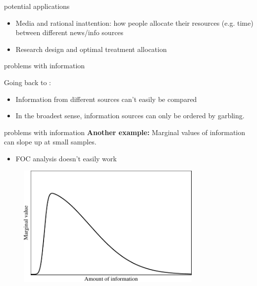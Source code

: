 \documentclass[square,]{gBakerBeamer}
\renewcommand{\|}{\,|\,}
\begin{document}
\begin{frame}{potential applications}

  \begin{itemize}
    \item Media and rational inattention: how people allocate their resources (e.g. time) between different news/info sources\bigskip

    \item Research design and optimal treatment allocation
  \end{itemize}

\end{frame}


\begin{frame}{problems with information}

  Going back to \cite{Blackwell1951}:\bigskip

  \begin{itemize}
    \item<1-> Information from different sources can't easily be compared\bigskip
    \item<2-> In the broadest sense, information sources can only be ordered by
          garbling.
  \end{itemize}
\end{frame}


\begin{frame}{problems with information}
  \textbf{Another example:}  Marginal values of
  information can slope up at small samples.

  \begin{itemize}
    \item FOC analysis doesn't easily work
  \end{itemize}

  \begin{figure}[h]
    \centering
    \includegraphics[width=0.8\textwidth]{figures/figradnerpres.pdf}
  \end{figure}

\end{frame}
\end{document}
